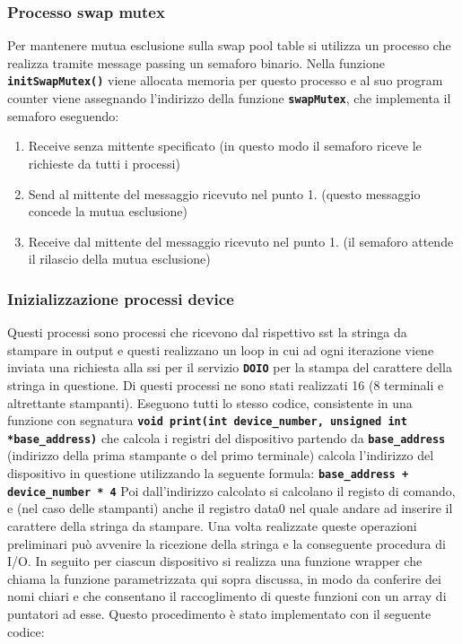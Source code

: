\documentclass{article}
\begin{document}
	\subsubsection{Processo swap mutex}
	Per mantenere mutua esclusione sulla swap pool table si utilizza un processo
	che realizza tramite message passing un semaforo binario. Nella funzione \texttt{\textbf{initSwapMutex()}}
	viene allocata memoria per questo processo e al suo program counter viene
	assegnando l'indirizzo della funzione \texttt{\textbf{swapMutex}}, che
	implementa il semaforo eseguendo:
	\begin{enumerate}
		\item Receive senza mittente specificato (in questo modo il semaforo riceve
			le richieste da tutti i processi)

		\item Send al mittente del messaggio ricevuto nel punto 1. (questo messaggio
			concede la mutua esclusione)

		\item Receive dal mittente del messaggio ricevuto nel punto 1. (il semaforo
			attende il rilascio della mutua esclusione)
	\end{enumerate}
	\subsubsection{Inizializzazione processi device}
	Questi processi sono processi che ricevono dal rispettivo sst la stringa da stampare
	in output e questi realizzano un loop in cui ad ogni iterazione viene inviata una
	richiesta alla ssi per il servizio \texttt{\textbf{DOIO}} per la stampa del
	carattere della stringa in questione. Di questi processi ne sono stati realizzati
	16 (8 terminali e altrettante stampanti). Eseguono tutti lo stesso codice, consistente
	in una funzione con segnatura \texttt{\textbf{void print(int device\_number, unsigned
	int *base\_address)}} che calcola i registri del dispositivo partendo da
	\texttt{\textbf{base\_address}} (indirizzo della prima stampante o del primo
	terminale) calcola l'indirizzo del dispositivo in questione utilizzando la seguente
	formula:
	\newline
	\texttt{\textbf{base\_address + device\_number * 4}}
	\newline
	Poi dall'indirizzo calcolato si calcolano il registo di comando, e (nel caso delle
	stampanti) anche il registro data0 nel quale andare ad inserire il carattere
	della stringa da stampare. Una volta realizzate queste operazioni preliminari può
	avvenire la ricezione della stringa e la conseguente procedura di I/O.
	\newline
	In seguito per ciascun dispositivo si realizza una funzione wrapper che chiama
	la funzione parametrizzata qui sopra discussa, in modo da conferire dei nomi chiari
	e che consentano il raccoglimento di queste funzioni con un array di puntatori
	ad esse. Questo procedimento è stato implementato con il seguente codice:
\end{document}
